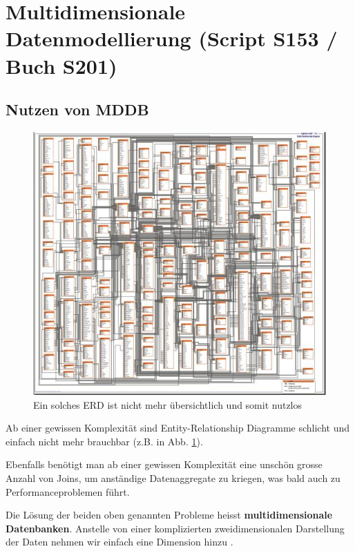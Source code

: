 \documentclass[a4paper, 11pt, nofootinbib]{article}
\begin{document}
\newpage

\section{Multidimensionale Datenmodellierung (Script S153 / Buch S201)}
\subsection{Nutzen von MDDB}
\begin{figure}
	\centering
	\includegraphics[keepaspectratio=true,height=18\baselineskip]{erd.JPG}
	\caption{Ein solches ERD ist nicht mehr übersichtlich und somit nutzlos}
	\label{fig:erd}
\end{figure}
Ab einer gewissen Komplexität sind Entity-Relationship Diagramme schlicht und einfach nicht mehr brauchbar (z.B. in Abb. \ref{fig:erd}).

\vspace{10px}

\noindent Ebenfalls benötigt man ab einer gewissen Komplexität eine unschön grosse Anzahl von Joins, um anständige Datenaggregate zu kriegen, was bald auch zu Performanceproblemen führt. 

\vspace{10px}

\noindent Die Lösung der beiden oben genannten Probleme heisst \textbf{multidimensionale Datenbanken}. Anstelle von einer komplizierten zweidimensionalen Darstellung der Daten nehmen wir einfach eine Dimension hinzu .
\end{document}

